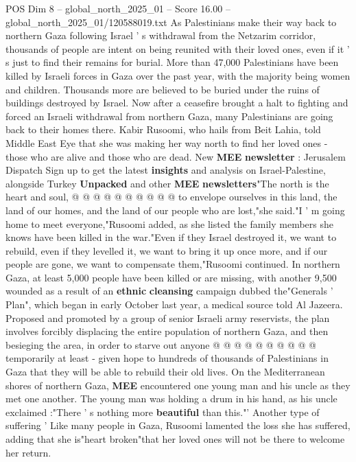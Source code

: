 \begin{textsample}{POS Dim 8 – global\_north\_2025\_01 – Score 16.00 – global\_north\_2025\_01/120588019.txt}  \label{ex:f8_pos_101}
As Palestinians make their way back to northern Gaza following Israel ' s withdrawal from the Netzarim corridor, thousands of people are intent on being reunited with their loved ones, even if it ' s just to find their remains for burial.
More than 47,000 Palestinians have been killed by Israeli forces in Gaza over the past year, with the majority being women and children.
Thousands more are believed to be buried under the ruins of buildings destroyed by Israel.
Now after a ceasefire brought a halt to fighting and forced an Israeli withdrawal from northern Gaza, many Palestinians are going back to their homes there.
Kabir Rusoomi, who hails from Beit Lahia, told Middle East Eye that she was making her way north to find her loved ones - those who are alive and those who are dead.
New \textbf{MEE} \textbf{newsletter} : Jerusalem Dispatch Sign up to get the latest \textbf{insights} and analysis on Israel-Palestine, alongside Turkey \textbf{Unpacked} and other \textbf{MEE} \textbf{newsletters}"The north is the heart and soul, @ @ @ @ @ @ @ @ @ @ to envelope ourselves in this land, the land of our homes, and the land of our people who are lost,"she said."I ' m going home to meet everyone,"Rusoomi added, as she listed the family members she knows have been killed in the war."Even if they Israel destroyed it, we want to rebuild, even if they levelled it, we want to bring it up once more, and if our people are gone, we want to compensate them,"Rusoomi continued.
In northern Gaza, at least 5,000 people have been killed or are missing, with another 9,500 wounded as a result of an \textbf{ethnic} \textbf{cleansing} campaign dubbed the"Generals ' Plan", which began in early October last year, a medical source told Al Jazeera.
Proposed and promoted by a group of senior Israeli army reservists, the plan involves forcibly displacing the entire population of northern Gaza, and then besieging the area, in order to starve out anyone @ @ @ @ @ @ @ @ @ @ temporarily at least - given hope to hundreds of thousands of Palestinians in Gaza that they will be able to rebuild their old lives.
On the Mediterranean shores of northern Gaza, \textbf{MEE} encountered one young man and his uncle as they met one another.
The young man was holding a drum in his hand, as his uncle exclaimed :"There ' s nothing more \textbf{beautiful} than this."' Another type of suffering ' Like many people in Gaza, Rusoomi lamented the loss she has suffered, adding that she is"heart broken"that her loved ones will not be there to welcome her return.

\end{textsample}

